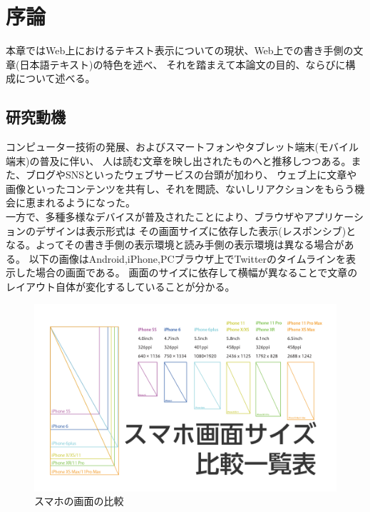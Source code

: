 
\chapter{序論}
\label{chap:introduction}

本章ではWeb上におけるテキスト表示についての現状、Web上での書き手側の文章(日本語テキスト)の特色を述べ、
それを踏まえて本論⽂の目的、ならびに構成について述べる。

\newpage

\section{研究動機}

コンピューター技術の発展、およびスマートフォンやタブレット端末(モバイル端末)の普及に伴い、
人は読む文章を映し出されたものへと推移しつつある。また、ブログやSNSといったウェブサービスの台頭が加わり、
ウェブ上に文章や画像といったコンテンツを共有し、それを閲読、ないしリアクションをもらう機会に恵まれるようになった。
\\一方で、多種多様なデバイスが普及されたことにより、ブラウザやアプリケーションのデザインは表示形式は
その画面サイズに依存した表示(レスポンシブ)となる。よってその書き手側の表示環境と読み手側の表示環境は異なる場合がある。
以下の画像はAndroid,iPhone,PCブラウザ上でTwitterのタイムラインを表示した場合の画面である。
画面のサイズに依存して横幅が異なることで文章のレイアウト自体が変化するしていることが分かる。

\begin{figure}[H]
    \centering
    \label{fig:image1}
    \includegraphics[width=0.7\columnwidth]{image/01/img1.png}
    \caption[スマホの画面の比較] {スマホの画面の比較\footnotemark[1]}
\end{figure}


